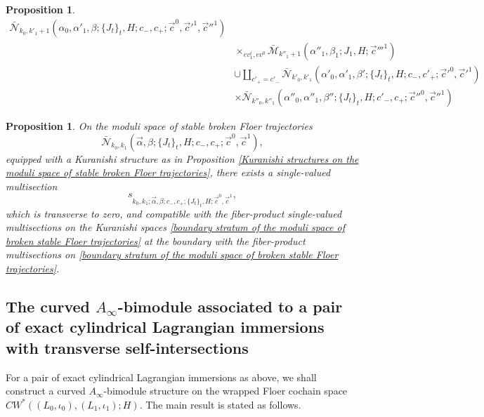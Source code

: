 \documentclass{amsart}
\newtheorem{proposition}[theorem]{Proposition}
\numberwithin{equation}{section}
\numberwithin{figure}{section}
\begin{document}
\begin{proposition}
\begin{equation}
\begin{split}
\bar{\mathcal{N}}_{k_{0}, k'_{1}+1}(\alpha_{0}, \alpha'_{1}, \beta; \{J_{t}\}_{t}, H; c_{-}, c_{+}; \vec{c}^{0}, \vec{c}'^{1}, \vec{c}''^{1})\\
&\times_{ev_{1}^{i}, ev^{0}} \bar{\mathcal{M}}_{k''_{1}+1}(\alpha''_{1}, \beta_{1}; J_{1}, H; \vec{c}'''^{1})\\
&\cup \coprod_{c'_{+} = c'_{-}} \bar{\mathcal{N}}_{k'_{0}, k'_{1}}(\alpha'_{0}, \alpha'_{1}, \beta'; \{J_{t}\}_{t}, H; c_{-}, c'_{+}; \vec{c}'^{0}, \vec{c}'^{1})\\
&\times \bar{\mathcal{N}}_{k''_{0}, k''_{1}}(\alpha''_{0}, \alpha''_{1}, \beta''; \{J_{t}\}_{t}, H; c'_{-}, c_{+}; \vec{c}''^{0}, \vec{c}''^{1})
\end{split}
\end{equation}
\end{proposition}

\begin{proposition} \label{existence of single-valued multisections on the moduli space of stable broken Floer trajectories}
	On the moduli space of stable broken Floer trajectories
\begin{equation*}
\bar{\mathcal{N}}_{k_{0}, k_{1}}(\vec{\alpha}, \beta; \{J_{t}\}_{t}, H; c_{-}, c_{+}; \vec{c}^{0}, \vec{c}^{1}),
\end{equation*}
equipped with a Kuranishi structure as in Proposition \ref{Kuranishi structures on the moduli space of stable broken Floer trajectories},
there exists a single-valued multisection
\begin{equation*}
s_{k_{0}, k_{1}; \vec{\alpha}, \beta; c_{-}, c_{+}; \{J_{t}\}_{t}, H; \vec{c}^{0}, \vec{c}^{1}},
\end{equation*}
which is transverse to zero, and compatible with the fiber-product single-valued multisections on the Kuranishi spaces \eqref{boundary stratum of the moduli space of broken stable Floer trajectories} at the boundary with the fiber-product multisections on \eqref{boundary stratum of the moduli space of broken stable Floer trajectories}.
\end{proposition}

\subsection{The curved $A_{\infty}$-bimodule associated to a pair of exact cylindrical Lagrangian immersions with transverse self-intersections}

	For a pair of exact cylindrical Lagrangian immersions as above, we shall construct a curved $A_{\infty}$-bimodule structure on the wrapped Floer cochain space $CW^{*}((L_{0}, \iota_{0}), (L_{1}, \iota_{1}); H)$. The main result is stated as follows. \par
\end{document}
